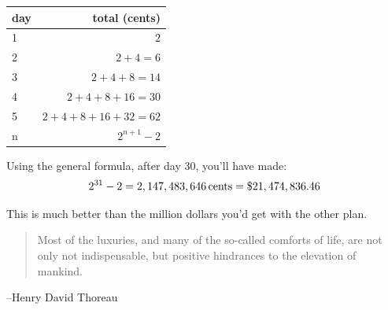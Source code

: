 \documentclass{exam}
\begin{document}
\begin{description}
        \begin{tabular}[H]{lr}
          \toprule
          day  & total (cents) \\
          \midrule
          1 & $2$ \\
          2 & $2 + 4 = 6$ \\
          3 & $2 + 4 + 8 = 14$ \\
          4 & $2 + 4 + 8 + 16 = 30$ \\
          5 & $2 + 4 + 8 + 16 + 32 = 62$ \\
          n & $2^{n + 1} - 2$ \\
          \bottomrule
        \end{tabular}

        Using the general formula, after day 30, you'll have made:
        \[
          2^{31} - 2 = \unit[2,147,483,646]{cents} = \$21,474,836.46
        \]

        This is much better than the million dollars you'd get with the other plan.
    \end{description}

  \else
    \vspace{6 cm}
    \begin{quote}
      \begin{em}
        Most of the luxuries, and many of the so-called comforts of life, are not only not indispensable, but positive
        hindrances to the elevation of mankind.  
      \end{em}
    \end{quote}

    \hspace{1 cm} --Henry David Thoreau
  \fi
\end{document}
